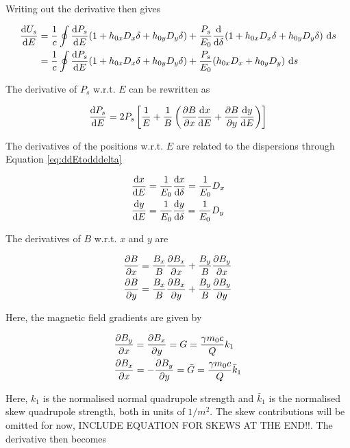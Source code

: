 Writing out the derivative then gives

\begin{align}
    \frac{\text{d} {U_s}}{\text{d} {E}} &= \frac{1}{c} \oint \frac{\text{d} {P_s}}{\text{d} {E}} (1 + h_{0x}D_x \delta + h_{0y} D_y \delta) + \frac{P_s}{E_0} \frac{\text{d} {}}{\text{d} {\delta}}(1 + h_{0x}D_x \delta + h_{0y} D_y \delta)\ \text{d} s\\
                    &= \frac{1}{c} \oint \frac{\text{d} {P_s}}{\text{d} {E}} (1 + h_{0x}D_x \delta + h_{0y} D_y \delta) + \frac{P_s}{E_0} (h_{0x}D_x + h_{0y} D_y)\ \text{d} s
\end{align}

The derivative of $P_s$ w.r.t. $E$ can be rewritten as

\begin{equation}
    \frac{\text{d} {P_s}}{\text{d} {E}} = 2 P_s \left[ \frac{1}{E} + \frac{1}{B} \left( \frac{\partial {B}}{\partial {x}} \frac{\text{d} {x}}{\text{d} {E}} + \frac{\partial {B}}{\partial {y}} \frac{\text{d} {y}}{\text{d} {E}} \right) \right]
\end{equation}

The derivatives of the positions w.r.t. $E$ are related to the dispersions through Equation \eqref{eq:ddEtodddelta}

\begin{align}
    \frac{\text{d} {x}}{\text{d} {E}} &= \frac{1}{E_0} \frac{\text{d} {x}}{\text{d} {\delta}} = \frac{1}{E_0} D_x\\
    \frac{\text{d} {y}}{\text{d} {E}} &= \frac{1}{E_0} \frac{\text{d} {y}}{\text{d} {\delta}} = \frac{1}{E_0} D_y
\end{align}

The derivatives of $B$ w.r.t. $x$ and $y$ are

\begin{align}
    \frac{\partial {B}}{\partial {x}} &= \frac{B_x}{B} \frac{\partial {B_x}}{\partial {x}} + \frac{B_y}{B} \frac{\partial {B_y}}{\partial {x}}\\
    \frac{\partial {B}}{\partial {y}} &= \frac{B_x}{B} \frac{\partial {B_x}}{\partial {y}} + \frac{B_y}{B} \frac{\partial {B_y}}{\partial {y}}
\end{align}

Here, the magnetic field gradients are given by

\begin{align}
    &\frac{\partial {B_y}}{\partial {x}} = \frac{\partial {B_x}}{\partial {y}}  = G       = \frac{\gamma m_0 c}{Q} k_1\\
    &\frac{\partial {B_x}}{\partial {x}} = -\frac{\partial {B_y}}{\partial {y}} = \bar{G} = \frac{\gamma m_0 c}{Q} \bar{k}_1
\end{align}

Here, $k_1$ is the normalised normal quadrupole strength and $\bar{k}_1$ is the normalised skew quadrupole strength, both in units of $1/m^2$. The skew contributions will be omitted for now, {\color{red} INCLUDE EQUATION FOR SKEWS AT THE END!!}. The derivative then becomes

